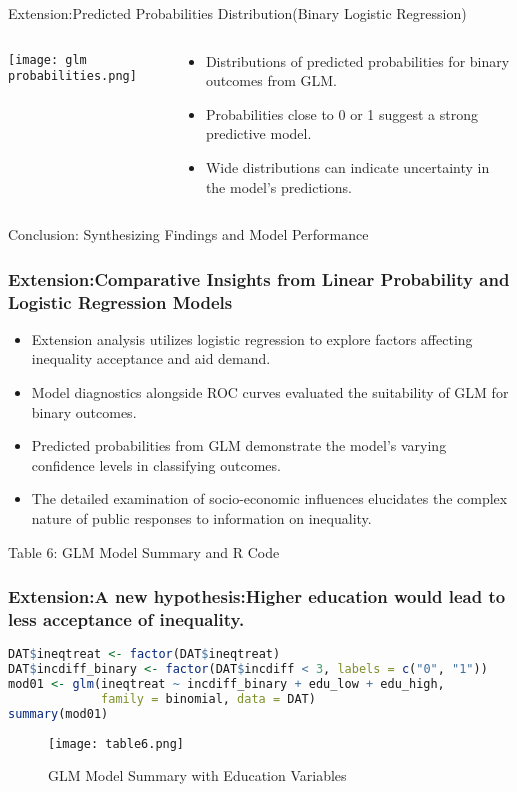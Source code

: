 \documentclass[aspectratio=169,10pt,compress]{beamer}
\begin{document}
\begin{frame}{Extension:Predicted Probabilities Distribution(Binary Logistic Regression)}
  \begin{columns}
    \begin{column}{0.6\textwidth}
      \texttt{[image: glm probabilities.png]}
    \end{column}
    \begin{column}{0.4\textwidth}
      \begin{itemize}
        \item Distributions of predicted probabilities for binary outcomes from GLM.
        \item Probabilities close to 0 or 1 suggest a strong predictive model.
        \item Wide distributions can indicate uncertainty in the model's predictions.
      \end{itemize}
    \end{column}
  \end{columns}
\end{frame}
\begin{frame}{Conclusion: Synthesizing Findings and Model Performance}
  \frametitle{Extension:Comparative Insights from Linear Probability and Logistic Regression Models}
  
  \begin{itemize}
    \item Extension analysis utilizes logistic regression to explore factors affecting inequality acceptance and aid demand.
    \item Model diagnostics alongside ROC curves evaluated the suitability of GLM for binary outcomes.
    \item Predicted probabilities from GLM demonstrate the model’s varying confidence levels in classifying outcomes.
    \item The detailed examination of socio-economic influences elucidates the complex nature of public responses to information on inequality.
    
  \end{itemize}
\end{frame}
\begin{frame}[fragile]{Table 6: GLM Model Summary and R Code}
  \frametitle{Extension:A new hypothesis:Higher education would lead to less acceptance of inequality. }

  
  
  \begin{lstlisting}[language=R]
DAT$ineqtreat <- factor(DAT$ineqtreat)
DAT$incdiff_binary <- factor(DAT$incdiff < 3, labels = c("0", "1"))
mod01 <- glm(ineqtreat ~ incdiff_binary + edu_low + edu_high, 
             family = binomial, data = DAT)
summary(mod01)
  \end{lstlisting}
  
  \begin{figure}
  \centering
  \texttt{[image: table6.png]} %
  \caption{GLM Model Summary with Education Variables}
\end{figure}
\end{frame}
\end{document}
